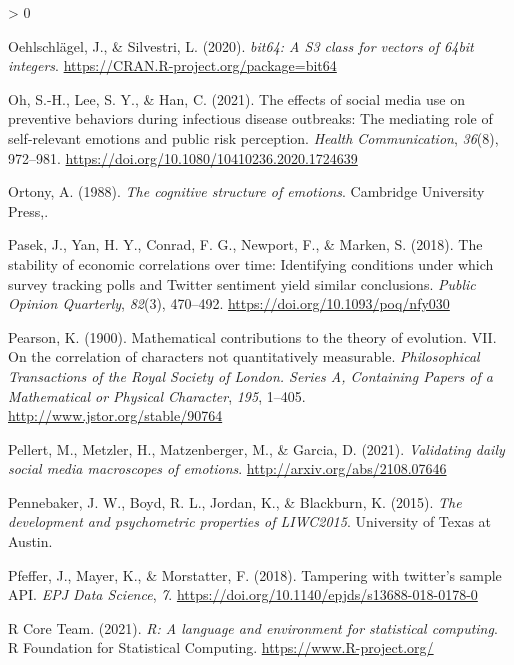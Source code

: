 \documentclass[
  english,
  jou,floatsintext]{apa7}
\newlength{\cslhangindent}
\newenvironment{CSLReferences}[2] %
 {%
  \setlength{\parindent}{0pt}
  \ifodd #1 \everypar{\setlength{\hangindent}{\cslhangindent}}\ignorespaces\fi
  \ifnum #2 > 0
  \setlength{\parskip}{#2\baselineskip}
  \fi
 }%
 {}
\begin{document}
\begin{CSLReferences}{1}{0}
\leavevmode\hypertarget{ref-R-bit64}{}%
Oehlschlägel, J., \& Silvestri, L. (2020). \emph{bit64: A S3 class for vectors of 64bit integers}. \url{https://CRAN.R-project.org/package=bit64}

\leavevmode\hypertarget{ref-Sang-Hwa2021}{}%
Oh, S.-H., Lee, S. Y., \& Han, C. (2021). The effects of social media use on preventive behaviors during infectious disease outbreaks: The mediating role of self-relevant emotions and public risk perception. \emph{Health Communication}, \emph{36}(8), 972--981. \url{https://doi.org/10.1080/10410236.2020.1724639}

\leavevmode\hypertarget{ref-Ortony1988}{}%
Ortony, A. (1988). \emph{The cognitive structure of emotions}. Cambridge University Press,.

\leavevmode\hypertarget{ref-Pasek_2018}{}%
Pasek, J., Yan, H. Y., Conrad, F. G., Newport, F., \& Marken, S. (2018). {The stability of economic correlations over time: Identifying conditions under which survey tracking polls and Twitter sentiment yield similar conclusions}. \emph{Public Opinion Quarterly}, \emph{82}(3), 470--492. \url{https://doi.org/10.1093/poq/nfy030}

\leavevmode\hypertarget{ref-Pearson1900}{}%
Pearson, K. (1900). Mathematical contributions to the theory of evolution. VII. On the correlation of characters not quantitatively measurable. \emph{Philosophical Transactions of the Royal Society of London. Series A, Containing Papers of a Mathematical or Physical Character}, \emph{195}, 1--405. \url{http://www.jstor.org/stable/90764}

\leavevmode\hypertarget{ref-pellert2021}{}%
Pellert, M., Metzler, H., Matzenberger, M., \& Garcia, D. (2021). \emph{Validating daily social media macroscopes of emotions}. \url{http://arxiv.org/abs/2108.07646}

\leavevmode\hypertarget{ref-pennebaker2015}{}%
Pennebaker, J. W., Boyd, R. L., Jordan, K., \& Blackburn, K. (2015). \emph{The development and psychometric properties of LIWC2015}. University of Texas at Austin.

\leavevmode\hypertarget{ref-Pfeffer2018}{}%
Pfeffer, J., Mayer, K., \& Morstatter, F. (2018). Tampering with twitter's sample API. \emph{EPJ Data Science}, \emph{7}. \url{https://doi.org/10.1140/epjds/s13688-018-0178-0}

\leavevmode\hypertarget{ref-R-base}{}%
R Core Team. (2021). \emph{R: A language and environment for statistical computing}. R Foundation for Statistical Computing. \url{https://www.R-project.org/}


\end{CSLReferences}
\end{document}
